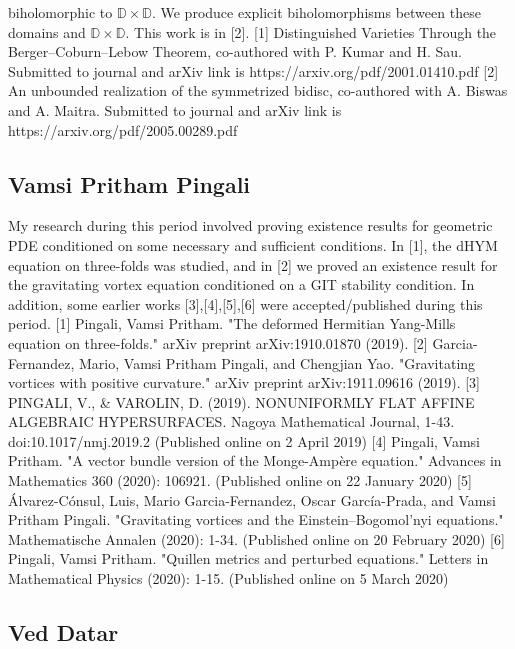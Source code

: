 biholomorphic to $\mathbb D \times \mathbb D$. We produce explicit biholomorphisms between these domains and $\mathbb D \times \mathbb D$. This work is in [2].  [1]  Distinguished Varieties Through the Berger--Coburn--Lebow Theorem,  co-authored with P. Kumar and H. Sau. Submitted to journal and arXiv link is https://arxiv.org/pdf/2001.01410.pdf   [2] An unbounded realization of the symmetrized bidisc, co-authored with A. Biswas and A. Maitra. Submitted to journal and arXiv link is  https://arxiv.org/pdf/2005.00289.pdf


\subsection{Vamsi Pritham Pingali}

My research during this period involved proving existence results for geometric PDE conditioned on some necessary and sufficient conditions. In [1], the dHYM equation on three-folds was studied, and in [2] we proved an existence result for the gravitating vortex equation conditioned on a GIT stability condition. In addition, some earlier works [3],[4],[5],[6] were accepted/published during this period.  [1] Pingali, Vamsi Pritham. "The deformed Hermitian Yang-Mills equation on three-folds." arXiv preprint arXiv:1910.01870 (2019). [2] Garcia-Fernandez, Mario, Vamsi Pritham Pingali, and Chengjian Yao. "Gravitating vortices with positive curvature." arXiv preprint arXiv:1911.09616 (2019). [3] PINGALI, V., & VAROLIN, D. (2019). NONUNIFORMLY FLAT AFFINE ALGEBRAIC HYPERSURFACES. Nagoya Mathematical Journal, 1-43. doi:10.1017/nmj.2019.2 (Published online on 2 April  2019) [4] Pingali, Vamsi Pritham. "A vector bundle version of the Monge-Ampère equation." Advances in Mathematics 360 (2020): 106921. (Published online on 22 January 2020) [5] Álvarez-Cónsul, Luis, Mario Garcia-Fernandez, Oscar García-Prada, and Vamsi Pritham Pingali. "Gravitating vortices and the Einstein–Bogomol’nyi equations." Mathematische Annalen (2020): 1-34. (Published online on 20 February 2020) [6] Pingali, Vamsi Pritham. "Quillen metrics and perturbed equations." Letters in Mathematical Physics (2020): 1-15. (Published online on 5 March 2020)


\subsection{Ved Datar}

